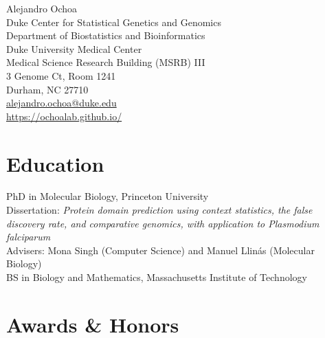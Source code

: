 \documentclass[12pt]{article} %
\newcommand{\years}[1]{\marginnote{\scriptsize #1}} %
\begin{document}
\begin{center}
  {\LARGE Alejandro Ochoa}\\[0.5cm] %
  Duke Center for Statistical Genetics and Genomics\\
  Department of Biostatistics and Bioinformatics\\
  Duke University Medical Center\\
  Medical Science Research Building (MSRB) III\\
  3 Genome Ct, Room 1241\\
  Durham, NC 27710\\
  \href{mailto:alejandro.ochoa@duke.edu}{alejandro.ochoa@duke.edu}\\ %
  \url{https://ochoalab.github.io/} \\ %
\end{center}



\section*{Education}

\years{2013}
PhD in Molecular Biology, Princeton University
\\
Dissertation:
\emph{Protein domain prediction using context statistics, the false discovery rate, and comparative genomics, with application to Plasmodium falciparum}
\\
Advisers:
Mona Singh (Computer Science) and Manuel Llinás (Molecular Biology)
\\
\years{2006}
\textsc{BS} in Biology and Mathematics, Massachusetts Institute of Technology

\section*{Awards \& Honors}
\end{document}
